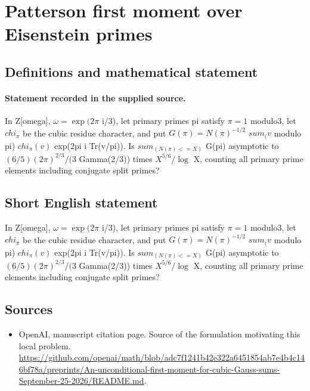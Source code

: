 \documentclass[11pt]{article}
\begin{document}
\section*{Patterson first moment over Eisenstein primes}\label{statement}
\subsection{Definitions and mathematical statement}
\paragraph{Statement recorded in the supplied source.}
In Z[omega], $\omega =\exp (2\pi $ i/3), let primary primes pi satisfy $\pi =1$ modulo3, let $chi_\pi $ be the cubic residue character, and put $G(\pi )=N(\pi )^{-1/2}$ $sum_(v$ modulo pi) $chi_\pi (v)$ exp(2pi i Tr(v/pi)). Is $sum_(N(\pi )<=X)$ G(pi) asymptotic to $(6/5)(2\pi )^{2/3}/(3$ Gamma(2/3)) times $X^{5/6}/\log $ X, counting all primary prime elements including conjugate split primes?
\subsection{Short English statement}
In Z[omega], $\omega =\exp (2\pi $ i/3), let primary primes pi satisfy $\pi =1$ modulo3, let $chi_\pi $ be the cubic residue character, and put $G(\pi )=N(\pi )^{-1/2}$ $sum_(v$ modulo pi) $chi_\pi (v)$ exp(2pi i Tr(v/pi)). Is $sum_(N(\pi )<=X)$ G(pi) asymptotic to $(6/5)(2\pi )^{2/3}/(3$ Gamma(2/3)) times $X^{5/6}/\log $ X, counting all primary prime elements including conjugate split primes?
\subsection{Sources}
\begin{itemize}
\item[S1] OpenAI, manuscript citation page. Source of the formulation motivating this local problem.
\url{https://github.com/openai/math/blob/adc7f1241b42e322a6451854ab7e4b4c146bf78a/preprints/An-unconditional-first-moment-for-cubic-Gauss-sums-September-25-2026/README.md}.
\end{itemize}
\end{document}
